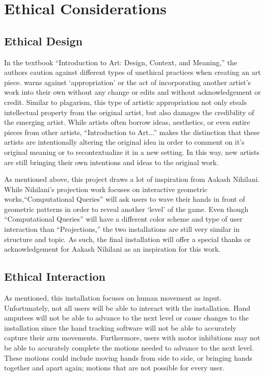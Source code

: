 \documentclass[10pt,twocolumn]{article}
\begin{document}
\section{Ethical Considerations}

\subsection{Ethical Design}\label{sec:design}

In the textbook ``Introduction to Art: Design, Context, and Meaning,'' \cite{blood_introduction_nodate}the authors caution against different types of unethical practices when creating an art piece. \citeauthor{blood_introduction_nodate} warns against `appropriation' or the act of incorporating another artist's work into their own without any change or edits and without acknowledgement or credit. Similar to plagarism, this type of artistic appropriation not only steals intellectual property from the original artist, but also damages the credibility of the emerging artist.  While artists often borrow ideas, aesthetics, or even entire pieces from other artists, ``Introduction to Art...'' makes the distinction that these artists are intentionally altering the original idea in order to comment on it's original meaning or to recontextualize it in a new setting. In this way, new artists are still bringing their own intentions and ideas to the original work.  

As mentioned above, this project draws a lot of inspiration from Aakash Nihilani.  While Nihilani's projection work focuses on interactive geometric works,``Computational Queries'' will ask users to wave their hands in front of geometric patterns in order to reveal another `level' of the game.  Even though ``Computational Queries'' will have a different color scheme and type of user interaction than ``Projections,'' the two installations are still very similar in structure and topic.  As such, the final installation will offer a special thanks or acknowledgement for Aakash Nihilani as an inspiration for this work. 

\subsection{Ethical Interaction}\label{sec:interaction}

As mentioned, this installation focuses on human movement as input.  Unfortunately, not all users will be able to interact with the installation.  Hand amputees will not be able to advance to the next level or cause changes to the installation since the hand tracking software will not be able to accurately capture their arm movements. Furthermore, users with motor inhibitions may not be able to accurately complete the motions needed to advance to the next level.  These motions could include moving hands from side to side, or bringing hands together and apart again; motions that are not possible for every user. 
\end{document}

